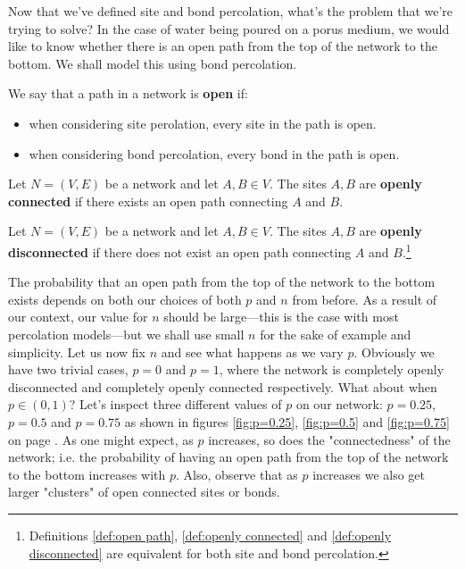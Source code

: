Now that we've defined site and bond percolation, what's the problem that we're trying to solve? In the case of water being poured on a porus medium, we would like to know
whether there is an open path from the top of the network to the bottom. We shall model this using bond percolation.

\begin{definition}\label{def:open path}
  We say that a path in a network is \textbf{open} if:
  \begin{itemize}
    \item when considering site perolation, every site in the path is open.
    \item when considering bond percolation, every bond in the path is open.
  \end{itemize}
\end{definition}

\begin{definition}\label{def:openly connected}
  Let $N=(V, E)$ be a network and let $A, B \in V$. The sites $A, B$ are \textbf{openly connected} if there exists an open path connecting $A$ and $B$.
\end{definition}

\begin{definition}\label{def:openly disconnected}
  Let $N=(V, E)$ be a network and let $A, B \in V$. The sites $A, B$ are \textbf{openly disconnected} if there does not exist an open path connecting $A$ and
  $B$.\footnote{Definitions \ref{def:open path}, \ref{def:openly connected} and \ref{def:openly disconnected} are equivalent for both site and bond percolation.}
\end{definition}

The probability that an open path from the top of the network to the bottom exists depends on both our choices of both $p$ and $n$ from before. As a result of our context, our value for $n$ should be
large---this is the case with most percolation models---but we shall use small $n$ for the sake of example and simplicity. Let us now fix $n$ and see what happens as we vary $p$. Obviously we have two trivial cases, $p=0$ and $p=1$,
where the network is completely openly disconnected and completely openly connected respectively.
What about when $p\in(0,1)$? Let's inspect three different values of $p$ on our network: $p=0.25$, $p=0.5$ and $p=0.75$ as shown in figures \ref{fig:p=0.25}, \ref{fig:p=0.5} and
\ref{fig:p=0.75} on page \pageref{fig:probabilities}.
As one might expect, as $p$ increases, so does the "connectedness" of the network; i.e. the probability of having an open path from the top of the network to the bottom increases
with $p$. Also, observe that as $p$ increases we also get larger "clusters" of open connected sites or bonds.

